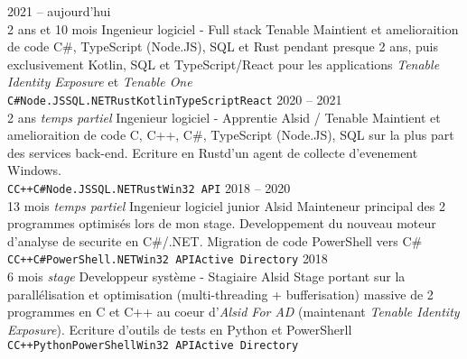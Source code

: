 \documentclass[8pt]{developercv} %
\begin{document}
\begin{entrylist}
	\entry
		{2021 -- aujourd'hui\\\footnotesize{2 ans et 10 mois}}
		{Ingenieur logiciel - Full stack}
		{Tenable}
		{
			Maintient et amelioraition de code C\#, TypeScript (Node.JS), SQL et Rust pendant presque 2 ans, puis exclusivement Kotlin,
			SQL et TypeScript/React pour les applications \emph{Tenable Identity Exposure} et \emph{Tenable One}\\
			\texttt{C\#}\slashsep\texttt{Node.JS}\slashsep\texttt{SQL}\slashsep\texttt{.NET}\slashsep\texttt{Rust}\slashsep\texttt{Kotlin}\slashsep\texttt{TypeScript}\slashsep\texttt{React}
		}
	\entry
		{2020 -- 2021\\\footnotesize{2 ans \emph{temps partiel}}}
		{Ingenieur logiciel - Apprentie}
		{Alsid / Tenable}
		{
			Maintient et amelioraition de code C, C++, C\#, TypeScript (Node.JS), SQL sur la plus part des services back-end. Ecriture en Rust\footnotemark[1] d'un agent de collecte d'evenement Windows.\\
			\texttt{C}\slashsep\texttt{C++}\slashsep\texttt{C\#}\slashsep\texttt{Node.JS}\slashsep\texttt{SQL}\slashsep\texttt{.NET}\slashsep\texttt{Rust}\slashsep\texttt{Win32 API}
		}
	\entry
		{2018 -- 2020\\\footnotesize{13 mois \emph{temps partiel}}}
		{Ingenieur logiciel junior}
		{Alsid}
		{
			Mainteneur principal des 2 programmes optimisés lors de mon stage. Developpement du nouveau moteur d'analyse de securite en C\#/.NET. Migration de code PowerShell vers C\#\\
			\texttt{C}\slashsep\texttt{C++}\slashsep\texttt{C\#}\slashsep\texttt{PowerShell}\slashsep\texttt{.NET}\slashsep\texttt{Win32 API}\slashsep\texttt{Active Directory}
		}
	\entry
		{2018\\\footnotesize{6 mois \emph{stage}}}
		{Developpeur système  - Stagiaire}
		{Alsid}
		{
			Stage portant sur la parallélisation et optimisation (multi-threading + bufferisation) massive de 2 programmes en C et C++ au coeur d'\emph{Alsid For AD} (maintenant \emph{Tenable Identity Exposure}).
			Ecriture d'outils de tests en Python et PowerSherll\\
			\texttt{C}\slashsep\texttt{C++}\slashsep\texttt{Python}\slashsep\texttt{PowerShell}\slashsep\texttt{Win32 API}\slashsep\texttt{Active Directory}
		}
\end{entrylist}

\vfill %
\end{document}
